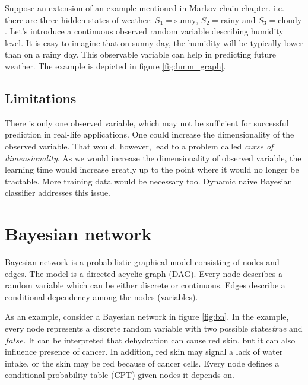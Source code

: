 \documentclass[thesis=B,english]{FITthesis}[2012/06/26]
\begin{document}
Suppose an extension of an example mentioned in Markov chain chapter. i.e. there are three hidden states of weather: $S_1 = \text{sunny}$, $S_2 = \text{rainy}$ and $S_3 = \text{cloudy}$. Let's introduce a continuous observed random variable describing humidity level. It is easy to imagine that on sunny day, the humidity will be typically lower than on a rainy day. This observable variable can help in predicting future weather. The example is depicted in figure \ref{fig:hmm_graph}.

\subsection{Limitations}
There is only one observed variable, which may not be sufficient for successful prediction in real-life applications. One could increase the dimensionality of the observed variable. That would, however, lead to a problem called \textit{curse of dimensionality}. As we would increase the dimensionality of observed variable, the learning time would increase greatly up to the point where it would no longer be tractable. More training data would be necessary too. Dynamic naive Bayesian classifier addresses this issue.

\section{Bayesian network}

Bayesian network is a probabilistic graphical model consisting of nodes and edges. The model is a directed acyclic graph (DAG). Every node describes a random variable which can be either discrete or continuous. Edges describe a conditional dependency among the nodes (variables).

As an example, consider a Bayesian network in figure \ref{fig:bn}. In the example, every node represents a discrete random variable with two possible states\textemdash\textit{true} and $false$. It can be interpreted that dehydration can cause red skin, but it can also influence presence of cancer. In addition, red skin may signal a lack of water intake, or the skin may be red because of cancer cells. Every node defines a conditional probability table (CPT) given nodes it depends on.
\end{document}
